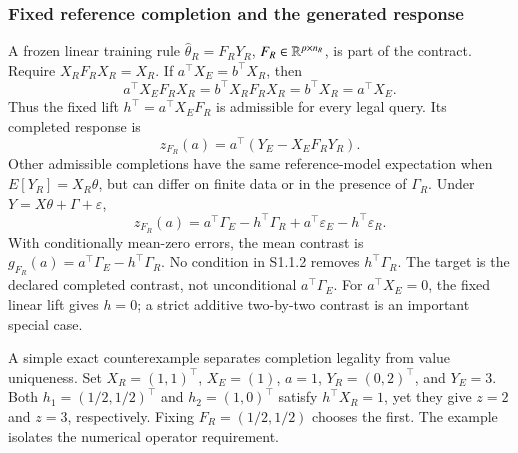 \documentclass[11pt]{article}
\begin{document}
\subsubsection{Fixed reference completion and the generated response}
A frozen linear training rule $\widehat\theta_R=F_RY_R$, $F_R\in\mathbb{R}^{p\times n_R}$, is part of the contract. Require $X_RF_RX_R=X_R$. If $a^\top X_E=b^\top X_R$, then
\[
a^\top X_EF_RX_R=b^\top X_RF_RX_R=b^\top X_R=a^\top X_E.
\]
Thus the fixed lift $h^\top=a^\top X_EF_R$ is admissible for every legal query. Its completed response is
\[
z_{F_R}(a)=a^\top(Y_E-X_EF_RY_R).
\]
Other admissible completions have the same reference-model expectation when $E[Y_R]=X_R\theta$, but can differ on finite data or in the presence of $\Gamma_R$. Under $Y=X\theta+\Gamma+\varepsilon$,
\[
z_{F_R}(a)=a^\top\Gamma_E-h^\top\Gamma_R
          +a^\top\varepsilon_E-h^\top\varepsilon_R.
\]
With conditionally mean-zero errors, the mean contrast is $g_{F_R}(a)=a^\top\Gamma_E-h^\top\Gamma_R$. No condition in S1.1.2 removes $h^\top\Gamma_R$. The target is the declared completed contrast, not unconditional $a^\top\Gamma_E$. For $a^\top X_E=0$, the fixed linear lift gives $h=0$; a strict additive two-by-two contrast is an important special case.

A simple exact counterexample separates completion legality from value uniqueness. Set $X_R=(1,1)^\top$, $X_E=(1)$, $a=1$, $Y_R=(0,2)^\top$, and $Y_E=3$. Both $h_1=(1/2,1/2)^\top$ and $h_2=(1,0)^\top$ satisfy $h^\top X_R=1$, yet they give $z=2$ and $z=3$, respectively. Fixing $F_R=(1/2,1/2)$ chooses the first. The example isolates the numerical operator requirement.
\end{document}

